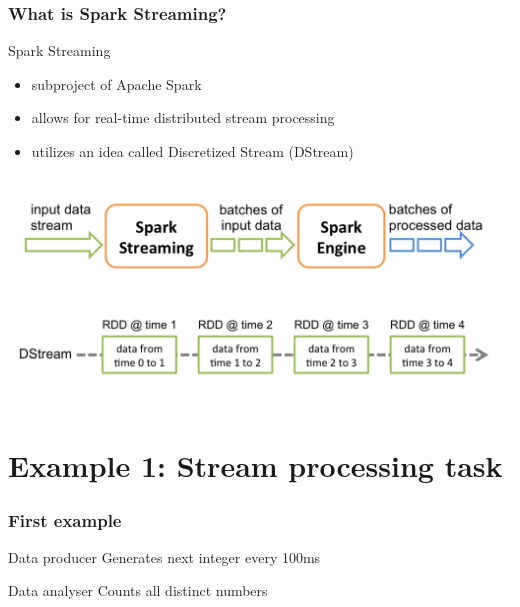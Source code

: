\documentclass{beamer}
\begin{document}
\begin{frame}
\frametitle{What is Spark Streaming?}

\begin{block}{Spark Streaming}
\begin{itemize}
	\item subproject of Apache Spark\texttrademark
	\item allows for real-time distributed stream processing
	\item utilizes an idea called Discretized Stream (DStream)
\end{itemize}
\vspace{-1em}
\includegraphics[width=\textwidth]{img/streaming-flow.png}
\vspace{-1em}
\includegraphics[width=\textwidth]{img/streaming-dstream.png}

\end{block}
\end{frame}

\section{Example 1: Stream processing task}

\begin{frame}[allowframebreaks]
\frametitle{First example}
\begin{block}{Data producer}
	Generates next integer every 100ms
\end{block}
\begin{block}{Data analyser}
	Counts all distinct numbers
\end{block}
\end{frame}
\end{document}
